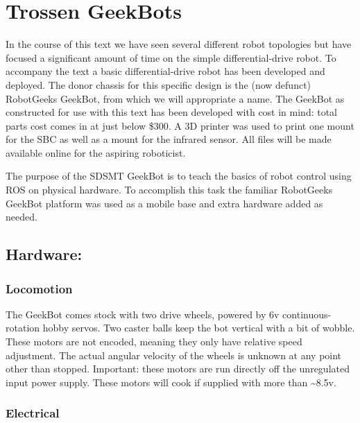 \hypertarget{trossen-geekbots}{%
\section{Trossen GeekBots}\label{trossen-geekbots}}

In the course of this text we have seen several different robot
topologies but have focused a significant amount of time on the simple
differential-drive robot. To accompany the text a basic
differential-drive robot has been developed and deployed. The donor
chassis for this specific design is the (now defunct) RobotGeeks
GeekBot, from which we will appropriate a name. The GeekBot as
constructed for use with this text has been developed with cost in mind:
total parts cost comes in at just below \$300. A 3D printer was used to
print one mount for the SBC as well as a mount for the infrared sensor.
All files will be made available online for the aspiring roboticist.

The purpose of the SDSMT GeekBot is to teach the basics of robot control
using ROS on physical hardware. To accomplish this task the familiar
RobotGeeks GeekBot platform was used as a mobile base and extra hardware
added as needed.

\hypertarget{hardware}{%
\subsection{Hardware:}\label{hardware}}

\hypertarget{locomotion}{%
\subsubsection{Locomotion}\label{locomotion}}

The GeekBot comes stock with two drive wheels, powered by 6v
continuous-rotation hobby servos. Two caster balls keep the bot vertical
with a bit of wobble. These motors are not encoded, meaning they only
have relative speed adjustment. The actual angular velocity of the
wheels is unknown at any point other than stopped. Important: these
motors are run directly off the unregulated input power supply. These
motors will cook if supplied with more than \textasciitilde8.5v.

\hypertarget{electrical}{%
\subsubsection{Electrical}\label{electrical}}

